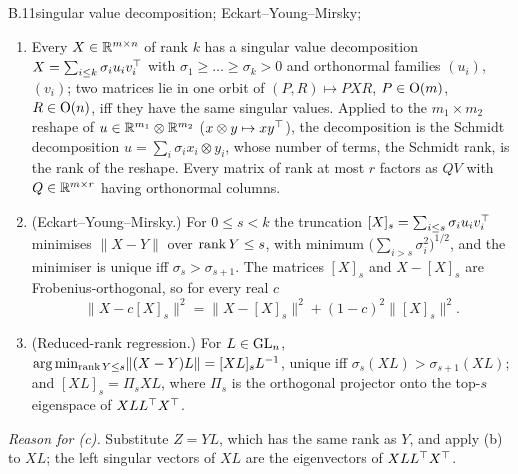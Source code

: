 \begin{auxresult}{B.11}{singular value decomposition; Eckart--Young--Mirsky}{\citep{xeckart1936approximation,
xmirsky1960symmetric}; \citep[Ch.~2 and 7]{xhorn2013matrix}}
\begin{enumerate}[label=(\alph*)]
  \item Every $X\in\mathbb{R}^{m\times n}$ of rank $k$ has a singular value decomposition $X=\sum_{i\le k}\sigma_iu_iv_i^{\top}$ with
    $\sigma_1\ge\dots\ge\sigma_k>0$ and orthonormal families $(u_i)$, $(v_i)$; two matrices lie in one orbit of
    $(P,R)\mapsto PXR$, $P\in\mathrm{O}(m)$, $R\in\mathrm{O}(n)$, iff they have the same singular values. Applied to the
    $m_1\times m_2$ reshape of $u\in\mathbb{R}^{m_1}\otimes\mathbb{R}^{m_2}$ ($x\otimes y\mapsto xy^{\top}$), the decomposition is the Schmidt
    decomposition $u=\sum_i\sigma_ix_i\otimes y_i$, whose number of terms, the Schmidt rank, is the rank of the reshape.
    Every matrix of rank at most $r$ factors as $QV$ with $Q\in\mathbb{R}^{m\times r}$ having orthonormal columns.
  \item (Eckart--Young--Mirsky.) For $0\le s<k$ the truncation $[X]_s=\sum_{i\le s}\sigma_iu_iv_i^{\top}$ minimises
    $\lVert X-Y\rVert$ over $\operatorname{rank} Y\le s$, with minimum $\big(\sum_{i>s}\sigma_i^2\big)^{1/2}$, and the minimiser is unique
    iff $\sigma_s>\sigma_{s+1}$. The matrices $[X]_s$ and $X-[X]_s$ are Frobenius-orthogonal, so for every real $c$
    \begin{equation*}
      \lVert X-c[X]_s\rVert^2=\lVert X-[X]_s\rVert^2+(1-c)^2\lVert[X]_s\rVert^2 .
    \end{equation*}
  \item (Reduced-rank regression.) For $L\in\mathrm{GL}_n$, $\arg\min_{\operatorname{rank} Y\le s}\lVert(X-Y)L\rVert=[XL]_sL^{-1}$, unique iff
    $\sigma_s(XL)>\sigma_{s+1}(XL)$; and $[XL]_s=\Pi_sXL$, where $\Pi_s$ is the orthogonal projector onto the top-$s$
    eigenspace of $XLL^{\top} X^{\top}$.
\end{enumerate}
\end{auxresult}
\noindent\emph{Reason for (c).} Substitute $Z=YL$, which has the same rank as $Y$, and apply (b) to $XL$; the left
singular vectors of $XL$ are the eigenvectors of $XLL^{\top} X^{\top}$.

